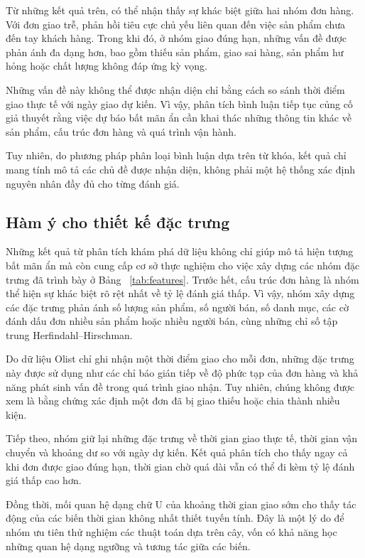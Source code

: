 \documentclass[12pt,a4paper]{report}
\begin{document}
Từ những kết quả trên, có thể nhận thấy sự khác biệt giữa hai nhóm đơn hàng. Với đơn giao trễ, phản hồi tiêu cực chủ yếu liên quan đến việc sản phẩm chưa đến tay khách hàng. Trong khi đó, ở nhóm giao đúng hạn, những vấn đề được phản ánh đa dạng hơn, bao gồm thiếu sản phẩm, giao sai hàng, sản phẩm hư hỏng hoặc chất lượng không đáp ứng kỳ vọng.

Những vấn đề này không thể được nhận diện chỉ bằng cách so sánh thời điểm giao thực tế với ngày giao dự kiến. Vì vậy, phân tích bình luận tiếp tục củng cố giả thuyết rằng việc dự báo bất mãn ẩn cần khai thác những thông tin khác về sản phẩm, cấu trúc đơn hàng và quá trình vận hành.

Tuy nhiên, do phương pháp phân loại bình luận dựa trên từ khóa, kết quả chỉ mang tính mô tả các chủ đề được nhận diện, không phải một hệ thống xác định nguyên nhân đầy đủ cho từng đánh giá.

\subsection{Hàm ý cho thiết kế đặc trưng}\label{subsec:eda-implications}

Những kết quả từ phân tích khám phá dữ liệu không chỉ giúp mô tả hiện tượng bất mãn ẩn mà còn cung cấp cơ sở thực nghiệm cho việc xây dựng các nhóm đặc trưng đã trình bày ở Bảng ~\ref{tab:features}. Trước hết, cấu trúc đơn hàng là nhóm thể hiện sự khác biệt rõ rệt nhất về tỷ lệ đánh giá thấp. Vì vậy, nhóm xây dựng các đặc trưng phản ánh số lượng sản phẩm, số người bán, số danh mục, các cờ đánh dấu đơn nhiều sản phẩm hoặc nhiều người bán, cùng những chỉ số tập trung Herfindahl–Hirschman.
 
Do dữ liệu Olist chỉ ghi nhận một thời điểm giao cho mỗi đơn, những đặc trưng này được sử dụng như các chỉ báo gián tiếp về độ phức tạp của đơn hàng và khả năng phát sinh vấn đề trong quá trình giao nhận. Tuy nhiên, chúng không được xem là bằng chứng xác định một đơn đã bị giao thiếu hoặc chia thành nhiều kiện.

Tiếp theo, nhóm giữ lại những đặc trưng về thời gian giao thực tế, thời gian vận chuyển và khoảng dư so với ngày dự kiến. Kết quả phân tích cho thấy ngay cả khi đơn được giao đúng hạn, thời gian chờ quá dài vẫn có thể đi kèm tỷ lệ đánh giá thấp cao hơn.

Đồng thời, mối quan hệ dạng chữ U của khoảng thời gian giao sớm cho thấy tác động của các biến thời gian không nhất thiết tuyến tính. Đây là một lý do để nhóm ưu tiên thử nghiệm các thuật toán dựa trên cây, vốn có khả năng học những quan hệ dạng ngưỡng và tương tác giữa các biến.
\end{document}
